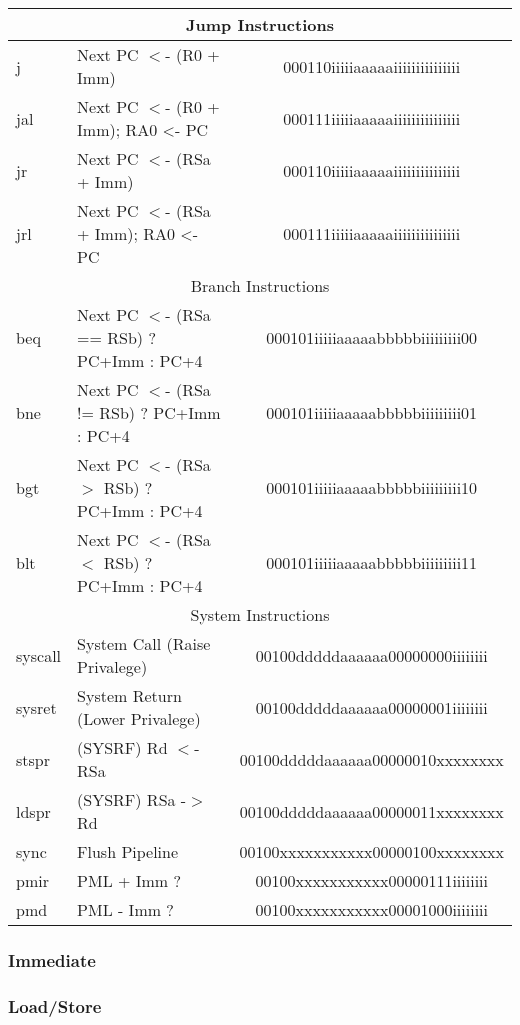 \documentclass[letterpaper, 11pt]{article}
\begin{document}
\begin{center}
\begin{longtable}{|l|l|c|}
			\hline
			\multicolumn{3}{|c|}{Jump Instructions} \\ \hline		
			j			& Next PC $<$- (R0 + Imm)						& 000110iiiiiaaaaaiiiiiiiiiiiiiii\\
			jal			& Next PC $<$- (R0 + Imm); RA0 <- PC 			& 000111iiiiiaaaaaiiiiiiiiiiiiiii\\
			jr			& Next PC $<$- (RSa + Imm)						& 000110iiiiiaaaaaiiiiiiiiiiiiiii\\
			jrl			& Next PC $<$- (RSa + Imm); RA0 <- PC			& 000111iiiiiaaaaaiiiiiiiiiiiiiii\\
			\hline
			\multicolumn{3}{|c|}{Branch Instructions} \\ \hline
			beq			& Next PC $<$- (RSa == RSb) ? PC+Imm : PC+4		& 000101iiiiiaaaaabbbbbiiiiiiiii00\\
			bne			& Next PC $<$- (RSa != RSb) ? PC+Imm : PC+4		& 000101iiiiiaaaaabbbbbiiiiiiiii01\\
			bgt			& Next PC $<$- (RSa $>$ RSb) ? PC+Imm : PC+4	& 000101iiiiiaaaaabbbbbiiiiiiiii10\\
			blt			& Next PC $<$- (RSa $<$ RSb) ? PC+Imm : PC+4	& 000101iiiiiaaaaabbbbbiiiiiiiii11\\
			\hline
			\multicolumn{3}{|c|}{System Instructions} \\ \hline
			syscall		& System Call (Raise Privalege)					& 00100dddddaaaaaa00000000iiiiiiii\\
			sysret		& System Return (Lower Privalege)				& 00100dddddaaaaaa00000001iiiiiiii\\
			stspr		& (SYSRF) Rd $<$- RSa							& 00100dddddaaaaaa00000010xxxxxxxx\\
			ldspr		& (SYSRF) RSa -$>$ Rd							& 00100dddddaaaaaa00000011xxxxxxxx\\
			sync		& Flush Pipeline								& 00100xxxxxxxxxxx00000100xxxxxxxx\\
			pmir		& PML + Imm ?									& 00100xxxxxxxxxxx00000111iiiiiiii\\
			pmd			& PML - Imm ?									& 00100xxxxxxxxxxx00001000iiiiiiii\\
			\hline
		\end{longtable}
	\end{center}


\subsubsection{Immediate}
\subsubsection{Load/Store}
\end{document}
